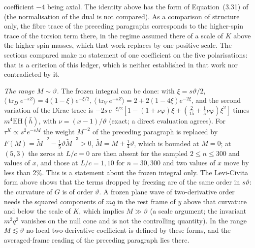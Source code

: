 coefficient \(-4\) being axial. The identity above has the form of Equation~(3.31) of~\cite{MantaSteinackerTran2024} (the normalisation of the dual is not compared). As a comparison of structure only, the fibre trace of the preceding paragraphs corresponds to the higher-spin trace of the torsion term there, in the regime assumed there of a scale of \(K\) above the higher-spin masses, which that work replaces by one positive scale. The sections compared make no statement of one coefficient on the five polarisations: that is a criterion of this ledger, which is neither established in that work nor contradicted by it.

\emph{The range \(M\sim\vartheta\).} The frozen integral can be done: with \(\xi=s\vartheta/2\), \(\langle\operatorname{tr}_De^{-sZ}\rangle=4(1-\xi)e^{-\xi/2}\), \(\langle\operatorname{tr}_Ve^{-sZ}\rangle=2+2(1-4\xi)e^{-2\xi}\), and the second variation of the Dirac trace is \(-2s\,e^{-\xi/2}[1-(1+\nu\varphi)\xi+(\tfrac2{15}+\tfrac15\nu\varphi)\xi^2]\) times \(m^4\mathrm{EH}(\bar h)\), with \(\nu=(x-1)/\vartheta\) (exact; a direct evaluation agrees). For \(\tau^K\propto s^2e^{-sM}\) the weight \(M^{-2}\) of the preceding paragraph is replaced by \(F(M)=\tilde M^{-2}-\tfrac15\vartheta\tilde M^{-3}>0\), \(\tilde M=M+\tfrac14\vartheta\), which is bounded at \(M=0\); at \((5,3)\) the zeros at \(L/c=0\) are then absent for the sampled \(2\le n\le300\) and values of \(x\), and those at \(L/c=1,10\) for \(n=30,300\) and two values of \(x\) move by less than \(2\%\). This is a statement about the frozen integral only. The Levi-Civita form above shows that the terms dropped by freezing are of the same order in \(s\vartheta\): the curvature of \(G\) is of order \(\vartheta\). A frozen plane wave of two-derivative order needs the squared components of \(mq\) in the rest frame of \(y\) above that curvature and below the scale of \(K\), which implies \(M\gg\vartheta\) (a scale argument; the invariant \(m^2q^2\) vanishes on the null cone and is not the controlling quantity). In the range \(M\lesssim\vartheta\) no local two-derivative coefficient is defined by these forms, and the averaged-frame reading of the preceding paragraph lies there.


